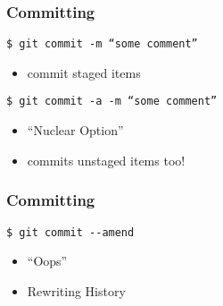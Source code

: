 \documentclass[english]{beamer}
\newcommand{\CMD}[1]{%
\texttt{\textcolor{code-blue}{#1}}%
}
\begin{document}
\begin{frame}
\frametitle{Committing}

\CMD{\$ git commit -m ``some comment''} \\
\begin{itemize}
        \item commit staged items
\end{itemize}

\vspace{.1\textheight}
\CMD{\$ git commit -a -m ``some comment''} \\
\begin{itemize}
        \item ``Nuclear Option'' \\
        \item commits unstaged items too!
\end{itemize}
\end{frame}

\begin{frame}
\frametitle{Committing}

\CMD{\$ git commit -{}-amend} \\
\begin{itemize}
        \item ``Oops'' \\
        \item Rewriting History
\end{itemize}
\end{frame}
\end{document}
